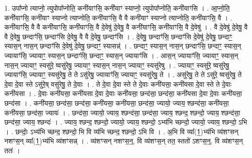 \documentclass[17pt]{extarticle}
\begin{document}
1. उपा᳚प्नो त्याप्नो॒ त्युपोपा᳚प्नोति॒ कनी॑याꣳसि॒ कनी॑याꣳ स्याप्नो॒ त्युपोपा᳚प्नोति॒ कनी॑याꣳसि । . आ॒प्नो॒ति॒ कनी॑याꣳसि॒ कनी॑याꣳ स्याप्नो त्याप्नोति॒ कनी॑याꣳसि॒ वै वै कनी॑याꣳ स्याप्नो त्याप्नोति॒ कनी॑याꣳसि॒ वै । . कनी॑याꣳसि॒ वै वै कनी॑याꣳसि॒ कनी॑याꣳसि॒ वै दे॒वेषु॑ दे॒वेषु॒ वै कनी॑याꣳसि॒ कनी॑याꣳसि॒ वै दे॒वेषु॑ । . वै दे॒वेषु॑ दे॒वेषु॒ वै वै दे॒वेषु॒ छन्दाꣳ॑सि॒ छन्दाꣳ॑सि दे॒वेषु॒ वै वै दे॒वेषु॒ छन्दाꣳ॑सि । . दे॒वेषु॒ छन्दाꣳ॑सि॒ छन्दाꣳ॑सि दे॒वेषु॑ दे॒वेषु॒ छन्दाꣳ॒॒ स्यास॒न् नास॒न् छन्दाꣳ॑सि दे॒वेषु॑ दे॒वेषु॒ छन्दाꣳ॒॒ स्यासन्न्॑ । . छन्दाꣳ॒॒ स्यास॒न् नास॒न् छन्दाꣳ॑सि॒ छन्दाꣳ॒॒ स्यास॒न् ज्यायाꣳ॑सि॒ ज्यायाꣳ॒॒ स्यास॒न् छन्दाꣳ॑सि॒ छन्दाꣳ॒॒ स्यास॒न् ज्यायाꣳ॑सि । . आस॒न् ज्यायाꣳ॑सि॒ ज्यायाꣳ॒॒ स्यास॒न् नास॒न् ज्यायाꣳ॒॒ स्यसु॑रे॒ ष्वसु॑रेषु॒ ज्यायाꣳ॒॒ स्यास॒न् नास॒न् ज्यायाꣳ॒॒ स्यसु॑रेषु । . ज्यायाꣳ॒॒ स्यसु॑रे॒ ष्वसु॑रेषु॒ ज्यायाꣳ॑सि॒ ज्यायाꣳ॒॒ स्यसु॑रेषु॒ ते ते ऽसु॑रेषु॒ ज्यायाꣳ॑सि॒ ज्यायाꣳ॒॒ स्यसु॑रेषु॒ ते । . असु॑रेषु॒ ते ते ऽसु॑रे॒ ष्वसु॑रेषु॒ ते दे॒वा दे॒वा स्ते ऽसु॑रे॒ष् वसु॑रेषु॒ ते दे॒वाः । . ते दे॒वा दे॒वा स्ते ते दे॒वाः कनी॑यसा॒ कनी॑यसा दे॒वा स्ते ते दे॒वाः कनी॑यसा । . दे॒वाः कनी॑यसा॒ कनी॑यसा दे॒वा दे॒वाः कनी॑यसा॒ छन्द॑सा॒ छन्द॑सा॒ कनी॑यसा दे॒वा दे॒वाः कनी॑यसा॒ छन्द॑सा । . कनी॑यसा॒ छन्द॑सा॒ छन्द॑सा॒ कनी॑यसा॒ कनी॑यसा॒ छन्द॑सा॒ ज्यायो॒ ज्याय॒ श्छन्द॑सा॒ कनी॑यसा॒ कनी॑यसा॒ छन्द॑सा॒ ज्यायः॑ । . छन्द॑सा॒ ज्यायो॒ ज्याय॒ श्छन्द॑सा॒ छन्द॑सा॒ ज्याय॒ श्छन्द॒ श्छन्दो॒ ज्याय॒ श्छन्द॑सा॒ छन्द॑सा॒ ज्याय॒ श्छन्दः॑ । . ज्याय॒ श्छन्द॒ श्छन्दो॒ ज्यायो॒ ज्याय॒ श्छन्दो॒ ऽभ्य॑भि च्छन्दो॒ ज्यायो॒ ज्याय॒ श्छन्दो॒ ऽभि । . छन्दोः॒ ऽभ्य॑भि च्छन्द॒ श्छन्दो॒ भि वि व्य॑भि च्छन्द॒ श्छन्दो॒ ऽभि वि । . अ॒भि वि व्या᳚(1॒)भ्य॑भि व्य॑शꣳसन् नशꣳस॒न् व्या᳚(1॒)भ्य॑भि व्य॑शꣳसन्न् । . व्य॑शꣳसन् नशꣳस॒न्॒. वि व्य॑शꣳस॒न् तत॒ स्ततो॑ ऽशꣳस॒न्॒. वि व्य॑शꣳस॒न् ततः॑ । \newline
\end{document}

